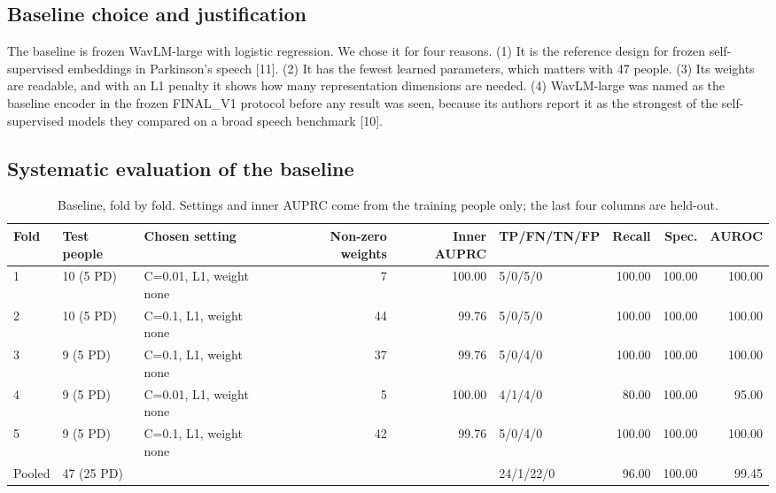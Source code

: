 \documentclass[11pt,a4paper]{article}
\begin{document}
\subsection{Baseline choice and justification}\label{sec:baselinechoice}
The baseline is frozen WavLM-large with logistic regression. We chose it for four reasons. (1) It is the reference design for frozen self-supervised embeddings in Parkinson's speech [11]. (2) It has the fewest learned parameters, which matters with 47 people. (3) Its weights are readable, and with an L1 penalty it shows how many representation dimensions are needed. (4) WavLM-large was named as the baseline encoder in the frozen FINAL\_V1 protocol before any result was seen, because its authors report it as the strongest of the self-supervised models they compared on a broad speech benchmark [10].

\subsection{Systematic evaluation of the baseline}\label{sec:baselineeval}
\begin{table}[H]\centering\scriptsize\renewcommand{\arraystretch}{1.15}
\caption{Baseline, fold by fold. Settings and inner AUPRC come from the training people only; the last four columns are held-out.}
\begin{adjustbox}{max width=\linewidth}\begin{tabular}{llp{3.1cm}rrlrrr}
\toprule
\textbf{Fold} & \textbf{Test people} & \textbf{Chosen setting} & \textbf{Non-zero weights} & \textbf{Inner AUPRC} & \textbf{TP/FN/TN/FP} & \textbf{Recall} & \textbf{Spec.} & \textbf{AUROC}\\
\midrule
1 & 10 (5 PD) & C=0.01, L1, weight none & 7 & 100.00 & 5/0/5/0 & 100.00 & 100.00 & 100.00\\
2 & 10 (5 PD) & C=0.1, L1, weight none & 44 & 99.76 & 5/0/5/0 & 100.00 & 100.00 & 100.00\\
3 & 9 (5 PD) & C=0.1, L1, weight none & 37 & 99.76 & 5/0/4/0 & 100.00 & 100.00 & 100.00\\
4 & 9 (5 PD) & C=0.01, L1, weight none & 5 & 100.00 & 4/1/4/0 & 80.00 & 100.00 & 95.00\\
5 & 9 (5 PD) & C=0.1, L1, weight none & 42 & 99.76 & 5/0/4/0 & 100.00 & 100.00 & 100.00\\
Pooled & 47 (25 PD) &  &  &  & 24/1/22/0 & 96.00 & 100.00 & 99.45\\
\bottomrule
\end{tabular}\end{adjustbox}\end{table}
\end{document}
